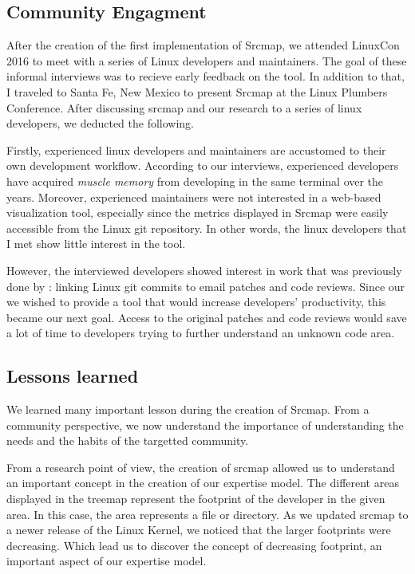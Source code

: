 \subsection{Community Engagment}

After the creation of the first implementation of Srcmap, we attended LinuxCon 2016 to meet with a series of Linux developers and maintainers. The goal of these informal interviews was to recieve early feedback on the tool. In addition to that, I traveled to Santa Fe, New Mexico to present Srcmap at the Linux Plumbers Conference. After discussing srcmap and our research to a series of linux developers, we deducted the following. 

Firstly, experienced linux developers and maintainers are accustomed to their own development workflow. According to our interviews, experienced developers have acquired \textit{muscle memory} from developing in the same terminal over the years. Moreover, experienced maintainers were not interested in a web-based visualization tool, especially since the metrics displayed in Srcmap were easily accessible from the Linux git repository. In other words, the linux developers that I met show little interest in the tool. 

However, the interviewed developers showed interest in work that was previously done by \cite{jiang14}: linking Linux git commits to email patches and code reviews. Since our we wished to provide a tool that would increase developers' productivity, this became our next goal. Access to the original patches and code reviews would save a lot of time to developers trying to further understand an unknown code area. 



\subsection{Lessons learned}
\label{sec:lessons_srcmap}

We learned many important lesson during the creation of Srcmap.  From a community perspective, we now understand the importance of understanding the needs and the habits of the targetted community. 


From a research point of view, the creation of srcmap allowed us to understand an important concept in the creation of our expertise model. The different areas displayed in the treemap represent the footprint of the developer in the given area. In this case, the area represents a file or directory. As we updated srcmap to a newer release of the Linux Kernel, we noticed that the larger footprints were decreasing. Which lead us to discover the concept of decreasing footprint, an important aspect of our expertise model. 


